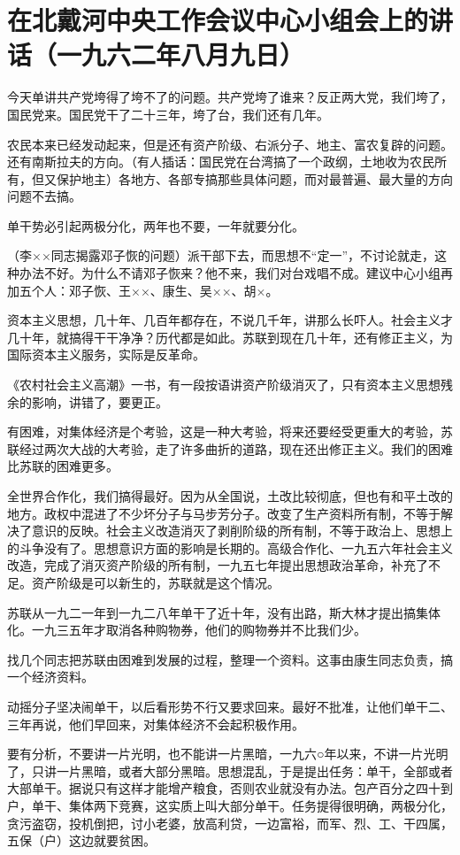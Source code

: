 \section{在北戴河中央工作会议中心小组会上的讲话（一九六二年八月九日）}


今天单讲共产党垮得了垮不了的问题。共产党垮了谁来？反正两大党，我们垮了，国民党来。国民党干了二十三年，垮了台，我们还有几年。

农民本来已经发动起来，但是还有资产阶级、右派分子、地主、富农复辟的问题。还有南斯拉夫的方向。（有人插话：国民党在台湾搞了一个政纲，土地收为农民所有，但又保护地主）各地方、各部专搞那些具体问题，而对最普遍、最大量的方向问题不去搞。

单干势必引起两极分化，两年也不要，一年就要分化。

（李××同志揭露邓子恢的问题）派干部下去，而思想不“定一”，不讨论就走，这种办法不好。为什么不请邓子恢来？他不来，我们对台戏唱不成。建议中心小组再加五个人：邓子恢、王××、康生、吴××、胡×。

资本主义思想，几十年、几百年都存在，不说几千年，讲那么长吓人。社会主义才几十年，就搞得干干净净？历代都是如此。苏联到现在几十年，还有修正主义，为国际资本主义服务，实际是反革命。

《农村社会主义高潮》一书，有一段按语讲资产阶级消灭了，只有资本主义思想残余的影响，讲错了，要更正。

有困难，对集体经济是个考验，这是一种大考验，将来还要经受更重大的考验，苏联经过两次大战的大考验，走了许多曲折的道路，现在还出修正主义。我们的困难比苏联的困难更多。

全世界合作化，我们搞得最好。因为从全国说，土改比较彻底，但也有和平土改的地方。政权中混进了不少坏分子与马步芳分子。改变了生产资料所有制，不等于解决了意识的反映。社会主义改造消灭了剥削阶级的所有制，不等于政治上、思想上的斗争没有了。思想意识方面的影响是长期的。高级合作化、一九五六年社会主义改造，完成了消灭资产阶级的所有制，一九五七年提出思想政治革命，补充了不足。资产阶级是可以新生的，苏联就是这个情况。

苏联从一九二一年到一九二八年单干了近十年，没有出路，斯大林才提出搞集体化。一九三五年才取消各种购物券，他们的购物券并不比我们少。

找几个同志把苏联由困难到发展的过程，整理一个资料。这事由康生同志负责，搞一个经济资料。

动摇分子坚决闹单干，以后看形势不行又要求回来。最好不批准，让他们单干二、三年再说，他们早回来，对集体经济不会起积极作用。

要有分析，不要讲一片光明，也不能讲一片黑暗，一九六○年以来，不讲一片光明了，只讲一片黑暗，或者大部分黑暗。思想混乱，于是提出任务：单干，全部或者大部单干。据说只有这样才能增产粮食，否则农业就没有办法。包产百分之四十到户，单干、集体两下竞赛，这实质上叫大部分单干。任务提得很明确，两极分化，贪污盗窃，投机倒把，讨小老婆，放高利贷，一边富裕，而军、烈、工、干四属，五保（户）这边就要贫困。

